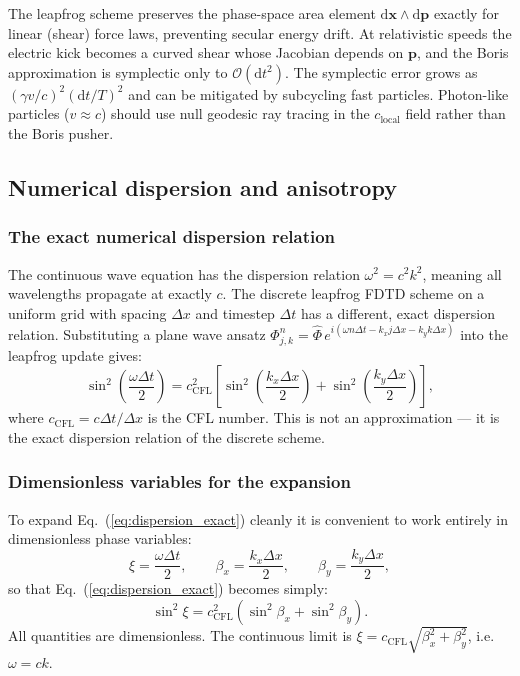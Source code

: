 \documentclass[11pt,a4paper]{article}
\newcommand{\vv}[1]{\mathbf{#1}}
\newcommand{\order}[1]{\mathcal{O}(#1)}
\newcommand{\dd}{\mathrm{d}}
\begin{document}
The leapfrog scheme preserves the phase-space area element $\dd\vv{x}\wedge\dd\vv{p}$ exactly for linear (shear) force laws, preventing secular energy drift.  At relativistic speeds the electric kick becomes a curved shear whose Jacobian depends on $\vv{p}$, and the Boris approximation is symplectic only to $\order{\dd t^2}$.  The symplectic error grows as $(\gamma v/c)^2(\dd t/T)^2$ and can be mitigated by subcycling fast particles.  Photon-like particles ($v\approx c$) should use null geodesic ray tracing in the $c_{\mathrm{local}}$ field rather than the Boris pusher.

\subsection{Numerical dispersion and anisotropy}
\label{sec:dispersion}

\subsubsection*{The exact numerical dispersion relation}

The continuous wave equation has the dispersion relation $\omega^2 = c^2k^2$, meaning all wavelengths propagate at exactly $c$.  The discrete leapfrog FDTD scheme on a uniform grid with spacing $\Delta x$ and timestep $\Delta t$ has a different, exact dispersion relation.  Substituting a plane wave ansatz $\Phi^n_{j,k} = \hat\Phi\,e^{i(\omega n\Delta t - k_x j\Delta x - k_y k\Delta x)}$ into the leapfrog update gives:
\begin{equation}
\label{eq:dispersion_exact}
  \sin^2\!\left(\frac{\omega\Delta t}{2}\right)
  = c_{\mathrm{CFL}}^2\!\left[\sin^2\!\left(\frac{k_x\Delta x}{2}\right) + \sin^2\!\left(\frac{k_y\Delta x}{2}\right)\right],
\end{equation}
where $c_{\mathrm{CFL}} = c\Delta t/\Delta x$ is the CFL number.  This is not an approximation --- it is the exact dispersion relation of the discrete scheme.

\subsubsection*{Dimensionless variables for the expansion}

To expand Eq.~(\ref{eq:dispersion_exact}) cleanly it is convenient to work entirely in dimensionless phase variables:
\begin{equation}
  \xi = \frac{\omega\Delta t}{2}, \qquad
  \beta_x = \frac{k_x\Delta x}{2}, \qquad
  \beta_y = \frac{k_y\Delta x}{2},
\end{equation}
so that Eq.~(\ref{eq:dispersion_exact}) becomes simply:
\begin{equation}
  \sin^2\xi = c_{\mathrm{CFL}}^2(\sin^2\beta_x + \sin^2\beta_y).
\end{equation}
All quantities are dimensionless.  The continuous limit is $\xi = c_{\mathrm{CFL}}\sqrt{\beta_x^2+\beta_y^2}$, i.e.\ $\omega = ck$.
\end{document}
